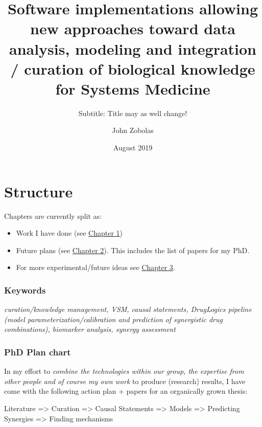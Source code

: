 \documentclass[12pt,]{book}
\title{Software implementations allowing new approaches toward data analysis, modeling and integration / curation of biological knowledge for Systems Medicine}
\subtitle{Subtitle: Title may as well change!}
\author{John Zobolas}
\date{August 2019}
\providecommand{\tightlist}{%
  \setlength{\itemsep}{0pt}\setlength{\parskip}{0pt}}
\begin{document}
\maketitle

{
\hypersetup{linkcolor=black}
\setcounter{tocdepth}{1}
\tableofcontents
}
\listoftables
\listoffigures
\hypertarget{structure}{%
\chapter*{Structure}\label{structure}}

Chapters are currently split as:

\begin{itemize}
\tightlist
\item
  Work I have done (see \protect\hyperlink{work}{Chapter 1})
\item
  Future plans (see \protect\hyperlink{plans}{Chapter 2}). This includes the list of papers for my PhD.
\item
  For more experimental/future ideas see \protect\hyperlink{ideas}{Chapter 3}.
\end{itemize}

\hypertarget{keywords}{%
\subsection*{Keywords}\label{keywords}}

\emph{curation/knowledge management, VSM, causal statements, DrugLogics pipeline
(model parameterization/calibration and prediction of synergistic drug combinations),
biomarker analysis, synergy assessment}

\hypertarget{phd-plan-chart}{%
\subsection*{PhD Plan chart}\label{phd-plan-chart}}

In my effort to \emph{combine the technologies within our group, the expertise from other people and of course my own work} to produce (research) results, I have come with the following action plan + papers for an organically grown thesis:

Literature =\textgreater{} Curation =\textgreater{} Causal Statements =\textgreater{} Models =\textgreater{} Predicting Synergies =\textgreater{} Finding mechanisms
\end{document}

